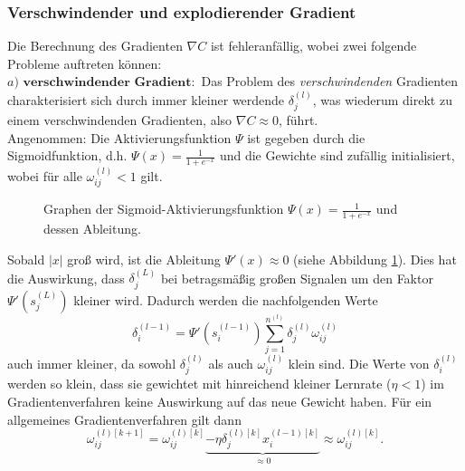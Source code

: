 \subsubsection{Verschwindender und explodierender Gradient}
Die Berechnung des Gradienten $\nabla C$ ist fehleranfällig, wobei zwei folgende Probleme auftreten können: \\
$a)$ $\textbf{verschwindender Gradient}:$
Das Problem des {\em verschwindenden} Gradienten charakterisiert sich durch immer kleiner werdende $\delta_j^{(l)}$, was wiederum
direkt zu einem verschwindenden Gradienten, also $\nabla C \approx 0$, führt. \\
Angenommen: Die Aktivierungsfunktion $\Psi$ ist gegeben durch die Sigmoidfunktion, d.h. \linebreak
$\Psi(x) =\frac{1}{1+e^{-x}}$ und die Gewichte sind zufällig initialisiert, wobei für alle $\omega_{ij}^{(l)}<1$ gilt.\\
\begin{figure}
    \begin{center}
        \caption{Graphen der Sigmoid-Aktivierungsfunktion $\Psi(x)=\frac{1}{1+e^{-x}}$ und dessen Ableitung.}
        \label{sigmoid-figure}
    \end{center}
\end{figure}
Sobald $|x|$ groß wird, ist die Ableitung $\Psi'(x) \approx 0$ (siehe Abbildung \ref{sigmoid-figure}). Dies hat die Auswirkung, dass
$\delta_j^{(L)}$ bei betragsmäßig großen Signalen um den Faktor $\Psi'(s_j^{(L)})$ kleiner wird. Dadurch werden die
nachfolgenden Werte
\[
    \delta_i^{(l-1)}=\Psi'(s_i^{(l-1)})\sum\limits_{j=1}^{n^{(l)}}\delta_j^{(l)} \omega_{ij}^{(l)}
\]
auch immer kleiner, da sowohl $\delta_j^{(l)}$ als auch $\omega_{ij}^{(l)}$ klein sind. Die Werte von $\delta_i^{(l)}$ werden
so klein, dass sie gewichtet mit hinreichend kleiner Lernrate ($\eta <1$) im Gradientenverfahren keine Auswirkung
auf das neue Gewicht haben. Für ein allgemeines Gradientenverfahren gilt dann
\[
    \omega_{ij}^{(l)[k+1]} = \omega_{ij}^{(l)[k]}\underbrace{-\eta \delta_j^{(l)[k]}x_i^{(l-1)[k]}}_{\approx 0}\approx \omega_{ij}^{(l)[k]}.
\]
